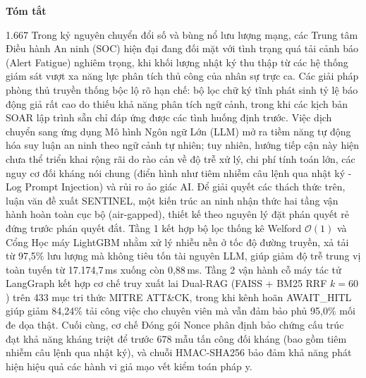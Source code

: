 \documentclass[12pt,a4paper]{report}
\begin{document}
\pagestyle{fancy}
\setcounter{page}{1}

\newpage
{}
\begin{center}
    {\Large\textbf{Tóm tắt}}
\end{center}
\vspace{0.5cm}

\begin{spacing}{1.667}
Trong kỷ nguyên chuyển đổi số và bùng nổ lưu lượng mạng, các Trung tâm Điều hành An ninh (SOC) hiện đại đang đối mặt với tình trạng quá tải cảnh báo (Alert Fatigue) nghiêm trọng, khi khối lượng nhật ký thu thập từ các hệ thống giám sát vượt xa năng lực phân tích thủ công của nhân sự trực ca. Các giải pháp phòng thủ truyền thống bộc lộ rõ hạn chế: bộ lọc chữ ký tĩnh phát sinh tỷ lệ báo động giả rất cao do thiếu khả năng phân tích ngữ cảnh, trong khi các kịch bản SOAR lập trình sẵn chỉ đáp ứng được các tình huống định trước. Việc dịch chuyển sang ứng dụng Mô hình Ngôn ngữ Lớn (LLM) mở ra tiềm năng tự động hóa suy luận an ninh theo ngữ cảnh tự nhiên; tuy nhiên, hướng tiếp cận này hiện chưa thể triển khai rộng rãi do rào cản về độ trễ xử lý, chi phí tính toán lớn, các nguy cơ đối kháng nói chung (điển hình như tiêm nhiễm câu lệnh qua nhật ký - Log Prompt Injection) và rủi ro ảo giác AI. Để giải quyết các thách thức trên, luận văn đề xuất SENTINEL, một kiến trúc an ninh nhận thức hai tầng vận hành hoàn toàn cục bộ (air-gapped), thiết kế theo nguyên lý đặt phán quyết rẻ đứng trước phán quyết đắt. Tầng 1 kết hợp bộ lọc thống kê Welford $\mathcal{O}(1)$ và Cổng Học máy LightGBM nhằm xử lý nhiễu nền ở tốc độ đường truyền, xả tải từ 97,5\% lưu lượng mà không tiêu tốn tài nguyên LLM, giúp giảm độ trễ trung vị toàn tuyến từ 17.174,7\,ms xuống còn 0,88\,ms. Tầng 2 vận hành cỗ máy tác tử LangGraph kết hợp cơ chế truy xuất lai Dual-RAG (FAISS + BM25 RRF $k=60$) trên 433 mục tri thức MITRE ATT\&CK, trong khi kênh hoãn AWAIT\_HITL giúp giảm 84,24\% tải công việc cho chuyên viên mà vẫn đảm bảo phủ 95,0\% mối đe dọa thật. Cuối cùng, cơ chế Đóng gói Nonce phân định bảo chứng cấu trúc đạt khả năng kháng triệt để trước 678 mẫu tấn công đối kháng (bao gồm tiêm nhiễm câu lệnh qua nhật ký), và chuỗi HMAC-SHA256 bảo đảm khả năng phát hiện hiệu quả các hành vi giả mạo vết kiểm toán pháp y.
\end{spacing}
\end{document}
